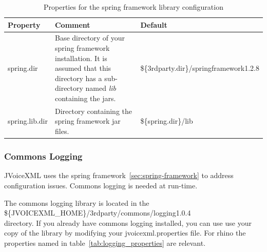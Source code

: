 \documentclass[11pt,a4paper]{article}
\begin{document}
\begin{table}[h]
\caption{Properties for the spring framework library configuration}
\label{tab:spring_properties}

\begin{center}

\begin{tabular}{|l|p{4cm}|l|}
\hline
\textbf{Property} & \textbf{Comment} & \textbf{Default} \\
\hline
\hline
spring.dir & 
Base directory of your spring framework installation.
It is assumed that this directory
has a sub-directory named \emph{lib} containing the jars.
& \$\{3rdparty.dir\}/springframework1.2.8 \\
\hline
spring.lib.dir & 
Directory containing the spring framework jar files.
& \$\{spring.dir\}/lib \\
\hline
\end{tabular}

\end{center}

\end{table}


\subsubsection{Commons Logging}
\label{sec:commons-logging}

JVoiceXML uses the spring framework~\ref{sec:spring-framework} to address 
configuration
issues. Commons logging is needed at run-time.

The commons logging library is located in the \\
\$\{JVOICEXML\_HOME\}/3rdparty/commons/logging1.0.4 \\
directory. If you already have commons logging installed, you can use
use your copy of the library by modifying your jvoicexml.properties file.
For rhino the properties named in table~\ref{tab:logging_properties} are 
relevant.
\end{document}
